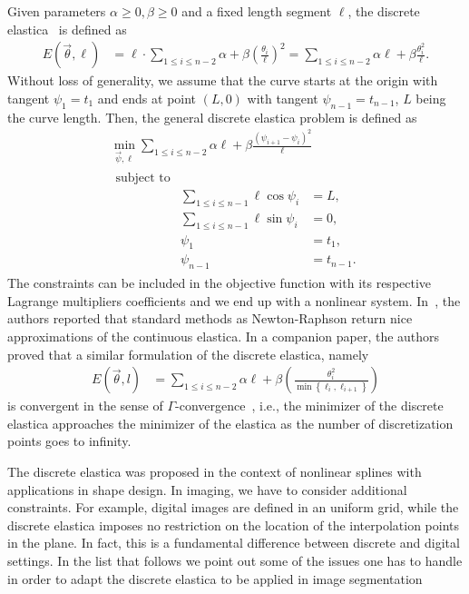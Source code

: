 Given parameters $\alpha \geq 0,\beta \geq 0$ and a fixed length segment $\ell$, the discrete elastica~\cite{bruckstein01discrete} is defined as
\begin{align}
	E(\vec{\theta},\ell) &= \ell \cdot \sum_{1 \leq i \leq n-2}{ \alpha + \beta \left(\frac{\theta_i}{\ell}\right)^2} = \sum_{1 \leq i \leq n-2}{ \alpha \ell + \beta \frac{\theta_i^2}{\ell}}.
	\label{ch3:eq:discrete-elastica}
\end{align}
%
Without loss of generality, we assume that the curve starts at the origin with tangent $\psi_1=t_1$ and ends at point $(L,0)$ with tangent $\psi_{n-1}=t_{n-1}$, $L$ being the curve length. Then, the general discrete elastica problem is defined as
\begin{align*}
	\min_{\vec{\psi},\ell}{ \sum_{1 \leq i \leq n-2 }{ \alpha \ell + \beta \frac{ (\psi_{i+1} - \psi_{i} )^2}{\ell}}}\\
	\begin{array}{rrl}
		\text{subject to}&& \\
		&\displaystyle \sum_{1 \leq i \leq n-1}{\ell\cos \psi_i} &= L, \\[1em]
		&\displaystyle \sum_{1 \leq i \leq n-1}{\ell\sin \psi_i} &= 0, \\[1em]
		&\displaystyle \psi_1 &= t_1, \\[1em]
		&\displaystyle \psi_{n-1} &= t_{n-1}.
	\end{array}
\end{align*}
%
The constraints can be included in the objective function with its respective Lagrange multipliers coefficients and we end up with a nonlinear system. In~\cite{bruckstein01discrete}, the authors reported that standard methods as Newton-Raphson return nice approximations of the continuous elastica. In a companion paper, the authors proved that a similar formulation of the discrete elastica, namely
\begin{align}
	E(\vec{\theta},l) &= \sum_{1 \leq i \leq n-2}{ \alpha \ell + \beta \left( \frac{\theta_i^2}{\min \left\{{\ell_i,\ell_{i+1}} \right\} }\right)}
	\label{ch3:eq:discrete-elastica}
\end{align}
%
is convergent in the sense of $\Gamma$-convergence~\cite{bruckstein01epi}, i.e., the minimizer of the discrete elastica approaches the minimizer of the elastica as the number of discretization points goes to infinity. 

The discrete elastica was proposed in the context of nonlinear splines with applications in shape design. In imaging, we have to consider additional constraints. For example,  digital images are defined in an uniform grid, while the discrete elastica imposes no restriction on the location of the interpolation points in the plane. In fact, this is a fundamental difference between discrete and digital settings. In the list that follows we point out some of the issues one has to handle in order to adapt the discrete elastica to be applied in image segmentation

